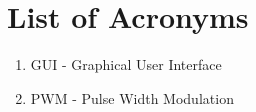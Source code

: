 \section{List of Acronyms}
\begin{enumerate}
	\item GUI - Graphical User Interface
	\item PWM - Pulse Width Modulation
\end{enumerate}
